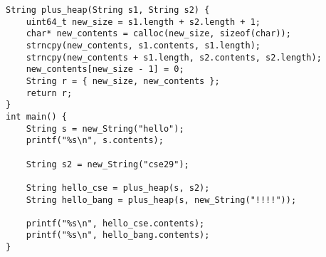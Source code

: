 \documentclass[12pt, oneside,landscape ]{article}
\begin{document}
\newpage

\begin{lstlisting}
String plus_heap(String s1, String s2) {
    uint64_t new_size = s1.length + s2.length + 1;
    char* new_contents = calloc(new_size, sizeof(char));
    strncpy(new_contents, s1.contents, s1.length);
    strncpy(new_contents + s1.length, s2.contents, s2.length);
    new_contents[new_size - 1] = 0;
    String r = { new_size, new_contents };
    return r;
}
int main() {
    String s = new_String("hello");
    printf("%s\n", s.contents);

    String s2 = new_String("cse29");

    String hello_cse = plus_heap(s, s2);
    String hello_bang = plus_heap(s, new_String("!!!!"));

    printf("%s\n", hello_cse.contents);
    printf("%s\n", hello_bang.contents);
}
\end{lstlisting}
\end{document}
